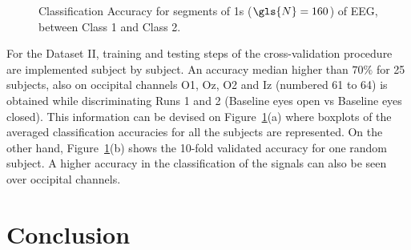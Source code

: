\begin{figure}[h!]
\centering
{}
\caption[PhysioNet Dataset Classification Rate]{Classification Accuracy for segments of 1s ($\gls{N} = 160$) of EEG, between Class 1 and Class 2.}
\label{fig:alpharesultsdatasetii}
\end{figure}


For the Dataset II, training and testing steps of the cross-validation procedure are implemented subject by subject.  An accuracy median higher than $70\%$ for 25 subjects, also on occipital channels O1, Oz, O2 and Iz (numbered 61 to 64) is obtained while discriminating Runs 1 and 2 (Baseline eyes open vs Baseline eyes closed).  This information can be devised on Figure~\ref{fig:alpharesultsdatasetii}(a) where boxplots of the averaged classification accuracies for all the subjects are represented.  On the other hand, Figure~\ref{fig:alpharesultsdatasetii}(b) shows the 10-fold validated accuracy for one random subject. A higher accuracy in the classification of the signals can also be seen over occipital channels.

\section{Conclusion}

